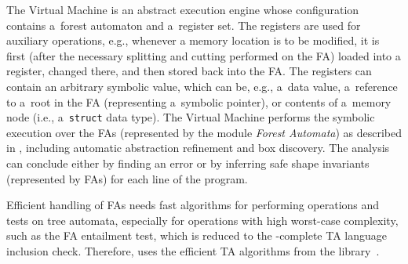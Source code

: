 {The Virtual Machine is an abstract execution engine whose configuration contains
a~forest automaton and a~register set.
The registers are used for auxiliary operations, e.g., whenever a memory
location is to be modified, it is first (after the necessary splitting and
cutting performed on the FA) loaded into a register, changed there, and then
stored back into the FA.
The registers can contain an arbitrary symbolic value, which can be, e.g.,
a~data value, a~reference to a~root in the FA (representing a~symbolic pointer),
or contents of a~memory node (i.e., a~\texttt{struct} data type).
The Virtual Machine performs the symbolic execution over the FAs (represented by
the module \emph{Forest Automata}) as described in ,
including automatic abstraction refinement and box discovery.
The analysis can conclude either by finding an error or by inferring
safe shape invariants (represented by FAs) for each line of the program.

Efficient handling of FAs needs fast algorithms for performing operations and
tests on tree automata, especially for operations with high worst-case
complexity, such as the FA entailment test, which is reduced to the
\exptime-complete TA language inclusion check.
Therefore, \forester uses the efficient TA algorithms from the \vata
library~\cite{libvata}.


}
